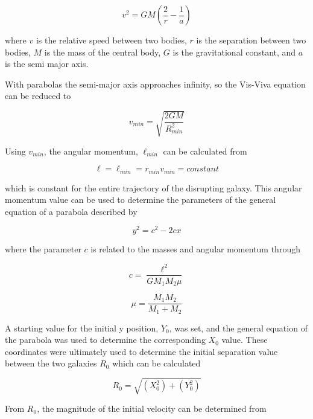 \documentclass[11pt]{article}
\begin{document}
\begin{equation}
v^2 = GM(\frac{2}{r} - \frac{1}{a}) 
\end{equation}

where $v$ is the relative speed between two bodies, $r$ is the separation between two bodies, $M$ is the mass of the central body, $G$ is the gravitational constant, and $a$ is the semi major axis.

With parabolas the semi-major axis approaches infinity, so the Vis-Viva equation can be reduced to

\begin{equation}
v_{min}= \sqrt{\frac{2GM}{R_{min}^2}}
\end{equation}

Using $v_{min}$, the angular momentum, $\ell_{min}$ can be calculated from

\begin{equation}
\ell = \ell_{min} = r_{min}v_{min}= constant 
\end{equation}

which is constant for the entire trajectory of the disrupting galaxy.  This angular momentum value can be used to determine the parameters of the general equation of a parabola described by

\begin{equation}
y^2 = c^2 - 2cx
\end{equation}

where the parameter $c$ is related to the masses and angular momentum through

\begin{equation}
c = \frac{\ell^2}{GM_1M_2\mu}
\label{c_eqn}
\end{equation}

\begin{equation}
\mu = \frac{M_1M_2}{M_1 + M_2}
\label{mu_eqn}
\end{equation}

A starting value for the initial y position, $Y_0$, was set, and the general equation of the parabola was used to determine the corresponding $X_0$ value.  These coordinates were ultimately used to determine the initial separation value between the two galaxies $R_0$ which can be calculated  

\begin{equation}
R_0 = \sqrt{(X_0^2) + (Y_0^2)}
\label{R0_eqn}
\end{equation}

From $R_0$, the magnitude of the initial velocity can be determined from 
\end{document}
